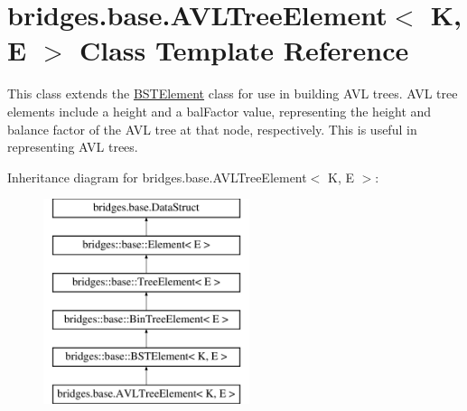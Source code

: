 \hypertarget{classbridges_1_1base_1_1_a_v_l_tree_element}{}\section{bridges.\+base.\+A\+V\+L\+Tree\+Element$<$ K, E $>$ Class Template Reference}
\label{classbridges_1_1base_1_1_a_v_l_tree_element}


This class extends the \hyperlink{classbridges_1_1base_1_1_b_s_t_element}{B\+S\+T\+Element} class for use in building A\+V\+L trees. A\+V\+L tree elements include a \textquotesingle{}height\textquotesingle{} and a \textquotesingle{}bal\+Factor\textquotesingle{} value, representing the height and balance factor of the A\+V\+L tree at that node, respectively. This is useful in representing A\+V\+L trees.  


Inheritance diagram for bridges.\+base.\+A\+V\+L\+Tree\+Element$<$ K, E $>$\+:\begin{figure}[H]
\begin{center}
\leavevmode
\includegraphics[height=6.000000cm]{classbridges_1_1base_1_1_a_v_l_tree_element}
\end{center}
\end{figure}
